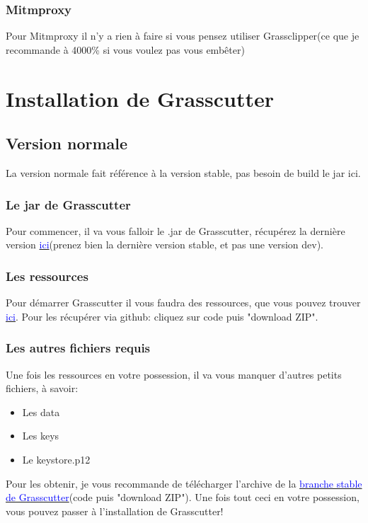 \documentclass{article}
\begin{document}
\subsubsection{Mitmproxy}
Pour Mitmproxy il n'y a rien à faire si vous pensez utiliser Grassclipper(ce que je recommande à 4000\% si vous voulez pas vous embêter)

\hrulefill

\section{Installation de Grasscutter}

\subsection{Version normale}
La version normale fait référence à la version stable, pas besoin de build le jar ici.

\subsubsection{Le jar de Grasscutter}
Pour commencer, il va vous falloir le .jar de Grasscutter, récupérez la dernière version \href{https://github.com/Grasscutters/Grasscutter/releases}{\textcolor{blue}{ici}}(prenez bien la dernière version stable, et pas une version dev).

\subsubsection{Les ressources}
Pour démarrer Grasscutter il vous faudra des ressources, que vous pouvez trouver \href{https://github.com/Koko-boya/Grasscutter_Resources/tree/main}{\textcolor{blue}{ici}}. Pour les récupérer via github: cliquez sur code puis "download ZIP".

\subsubsection{Les autres fichiers requis}
Une fois les ressources en votre possession, il va vous manquer d'autres petits fichiers, à savoir:
\begin{itemize}
	\item Les data
	\item Les keys
	\item Le keystore.p12
\end{itemize}

Pour les obtenir, je vous recommande de télécharger l'archive de la \href{https://github.com/Grasscutters/Grasscutter/tree/stable}{\textcolor{blue}{branche stable de Grasscutter}}(code puis "download ZIP").\newline
Une fois tout ceci en votre possession, vous pouvez passer à l'installation de Grasscutter!
\end{document}
